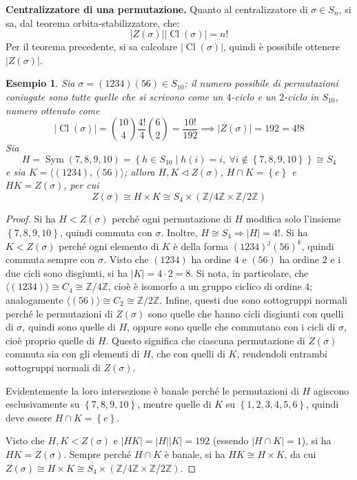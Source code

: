 \documentclass[11pt]{article}
\theoremstyle{style}
\newtheorem{esempio}{Esempio}[section]
\numberwithin{equation}{subsection}
\renewcommand{\textbf}[1]{\textsf{\bfseries #1}}
\begin{document}
\textbf{Centralizzatore di una permutazione.} Quanto al centralizzatore di $\sigma \in S_n$, si sa, dal teorema orbita-stabilizzatore, che:
\begin{equation}
\lvert Z(\sigma ) \rvert \lvert \operatorname{Cl} (\sigma ) \rvert = n!
\end{equation}
Per il teorema precedente, si sa calcolare $\lvert \operatorname{Cl} (\sigma ) \rvert $, quindi \`e possibile ottenere $\lvert Z(\sigma ) \rvert $.
\begin{esempio}
Sia $\sigma = (1234)(56) \in S_{10}$; il numero possibile di permutazioni coniugate sono tutte quelle che si scrivono come un $4$-ciclo e un $2$-ciclo in $S_{10}$, numero ottenuto come
\[
	\lvert \operatorname{Cl} (\sigma ) \rvert  = \binom{10}{4}\frac{4!}{4} \binom{6}{2}= \frac{10!}{192}\implies \lvert Z(\sigma ) \rvert = 192 = 4! 8
\] 
Sia
\[
H = \operatorname{Sym} \left(7,8,9,10\right) =\left\{ h \in S_{10}  \mid h(i) = i, \ \forall i \not \in \left\{ 7,8,9,10 \right\}  \right\} \cong S_4
\] 
e sia $K = \langle (1234),(56) \rangle$; allora $H,K \lhd Z(\sigma )$, $H\cap K = \left\{ e \right\} $ e $HK=Z(\sigma )$, per cui
\[
Z(\sigma ) \cong H \times K \cong S_4 \times (\mathbb{Z}/4\mathbb{Z} \times \mathbb{Z}/2\mathbb{Z})
\] 
\end{esempio}
\begin{proof}
	Si ha $H <Z(\sigma )$ perch\'e ogni permutazione di $H$ modifica solo l'insieme $\left\{ 7,8,9,10 \right\} $, quindi commuta con $\sigma $. Inoltre, $H \cong S_4 \Rightarrow \lvert H \rvert  = 4!$.
	Si ha $K<Z(\sigma )$ perch\'e ogni elemento di $K$ \`e della forma $(1234)^j(56)^k$, quindi commuta sempre con $\sigma $.
	Visto che $(1234)$ ha ordine $4$ e $(56)$ ha ordine $2$ e i due cicli sono disgiunti, si ha $\lvert K \rvert = 4 \cdot 2=8$.
	Si nota, in particolare, che $\langle (1234) \rangle\cong C_4\cong\mathbb{Z}/4\mathbb{Z}$, cio\`e \`e isomorfo a un gruppo ciclico di ordine $4$; analogamente $\langle (56) \rangle\cong C_2\cong\mathbb{Z}/2\mathbb{Z}$.
	Infine, questi due sono sottogruppi normali perch\'e le permutazioni di $Z(\sigma )$ sono quelle che hanno cicli disgiunti con quelli di $\sigma $, quindi sono quelle di $H$, oppure sono quelle che commutano con i cicli di $\sigma $, cio\`e proprio quelle di $H$.
	Questo significa che ciascuna permutazione di $Z(\sigma )$ commuta sia con gli elementi di $H$, che con quelli di $K$, rendendoli entrambi sottogruppi normali di $Z(\sigma )$.

	Evidentemente la loro intersezione \`e banale perch\'e le permutazioni di $H$ agiscono esclusivamente su $\left\{ 7,8,9,10 \right\} $, mentre quelle di $K$ su $\left\{ 1,2,3,4,5,6 \right\} $, quindi deve essere $H\cap K = \left\{ e \right\} $.

	Visto che $H,K < Z(\sigma )$ e $\lvert HK \rvert = \lvert H \rvert \lvert K \rvert =192 $ (essendo $\lvert H\cap K \rvert = 1$), si ha $HK = Z(\sigma )$.
	Sempre perch\'e $H\cap K$ \`e banale, si ha $HK \cong H \times K$, da cui $Z(\sigma ) \cong H \times K \cong S_4 \times (\mathbb{Z}/4\mathbb{Z} \times  \mathbb{Z}/2\mathbb{Z})$.
\end{proof}
\end{document}
